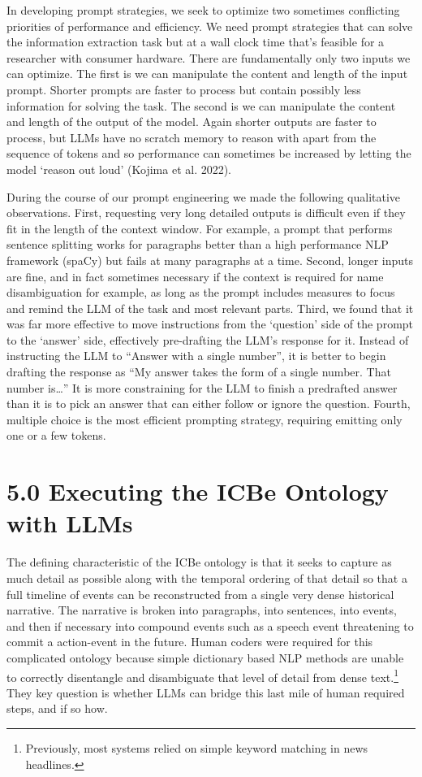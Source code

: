 \documentclass[
  letterpaper,
  DIV=11,
  numbers=noendperiod]{scrartcl}
\begin{document}
In developing prompt strategies, we seek to optimize two sometimes
conflicting priorities of performance and efficiency. We need prompt
strategies that can solve the information extraction task but at a wall
clock time that's feasible for a researcher with consumer hardware.
There are fundamentally only two inputs we can optimize. The first is we
can manipulate the content and length of the input prompt. Shorter
prompts are faster to process but contain possibly less information for
solving the task. The second is we can manipulate the content and length
of the output of the model. Again shorter outputs are faster to process,
but LLMs have no scratch memory to reason with apart from the sequence
of tokens and so performance can sometimes be increased by letting the
model `reason out loud' (Kojima et al. 2022).

During the course of our prompt engineering we made the following
qualitative observations. First, requesting very long detailed outputs
is difficult even if they fit in the length of the context window. For
example, a prompt that performs sentence splitting works for paragraphs
better than a high performance NLP framework (spaCy) but fails at many
paragraphs at a time. Second, longer inputs are fine, and in fact
sometimes necessary if the context is required for name disambiguation
for example, as long as the prompt includes measures to focus and remind
the LLM of the task and most relevant parts. Third, we found that it was
far more effective to move instructions from the `question' side of the
prompt to the `answer' side, effectively pre-drafting the LLM's response
for it. Instead of instructing the LLM to ``Answer with a single
number'', it is better to begin drafting the response as ``My answer
takes the form of a single number. That number is\ldots{}'' It is more
constraining for the LLM to finish a predrafted answer than it is to
pick an answer that can either follow or ignore the question. Fourth,
multiple choice is the most efficient prompting strategy, requiring
emitting only one or a few tokens.

\hypertarget{executing-the-icbe-ontology-with-llms}{%
\section{5.0 Executing the ICBe Ontology with
LLMs}\label{executing-the-icbe-ontology-with-llms}}

The defining characteristic of the ICBe ontology is that it seeks to
capture as much detail as possible along with the temporal ordering of
that detail so that a full timeline of events can be reconstructed from
a single very dense historical narrative. The narrative is broken into
paragraphs, into sentences, into events, and then if necessary into
compound events such as a speech event threatening to commit a
action-event in the future. Human coders were required for this
complicated ontology because simple dictionary based NLP methods are
unable to correctly disentangle and disambiguate that level of detail
from dense text.\footnote{Previously, most systems relied on simple
  keyword matching in news headlines.} They key question is whether LLMs
can bridge this last mile of human required steps, and if so how.
\end{document}
